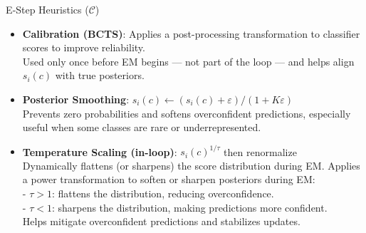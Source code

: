 \documentclass[aspectratio=169]{beamer}
\begin{document}
\begin{frame}{E‑Step Heuristics ($\mathcal{C}$)}
  \begin{itemize}
    \item \textbf{Calibration (BCTS)}: Applies a post-processing transformation to classifier scores to improve reliability.\\
    \small Used only once before EM begins — not part of the loop — and helps align $s_i(c)$ with true posteriors.
    \normalsize

    \item \textbf{Posterior Smoothing}: $s_i(c)\! \leftarrow\! (s_i(c)+\varepsilon)/(1+K\varepsilon)$\\
    \small Prevents zero probabilities and softens overconfident predictions, especially useful when some classes are rare or underrepresented.
    \normalsize

    \item \textbf{Temperature Scaling (in-loop)}: $s_i(c)^{1/\tau}$ then renormalize\\
    \small Dynamically flattens (or sharpens) the score distribution during EM. 
    \small Applies a power transformation to soften or sharpen posteriors during EM:\\
    - \( \tau > 1 \): flattens the distribution, reducing overconfidence.\\
    - \( \tau < 1 \): sharpens the distribution, making predictions more confident.\\Helps mitigate overconfident predictions and stabilizes updates.
  \end{itemize}
\end{frame}
\end{document}
